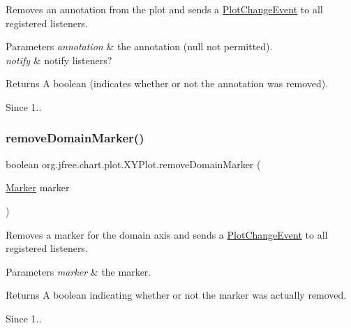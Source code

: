 Removes an annotation from the plot and sends a \mbox{\hyperlink{}{Plot\+Change\+Event}} to all registered listeners.


\begin{DoxyParams}{Parameters}
{\em annotation} & the annotation ({\ttfamily null} not permitted). \\
\hline
{\em notify} & notify listeners?\\
\hline
\end{DoxyParams}
\begin{DoxyReturn}{Returns}
A boolean (indicates whether or not the annotation was removed).
\end{DoxyReturn}
\begin{DoxySince}{Since}
1.. 
\end{DoxySince}
\mbox{\label{classorg_1_1jfree_1_1chart_1_1plot_1_1_x_y_plot_a7ed71c17fd5ae2ff77c3e38e52c0b634}} 
\subsubsection{\texorpdfstring{remove\+Domain\+Marker()}{removeDomainMarker()}\hspace{0.1cm}{\footnotesize\ttfamily [1/4]}}
{\footnotesize\ttfamily boolean org.\+jfree.\+chart.\+plot.\+X\+Y\+Plot.\+remove\+Domain\+Marker (\begin{DoxyParamCaption}\item[{\mbox{\hyperlink{classorg_1_1jfree_1_1chart_1_1plot_1_1_marker}{Marker}}}]{marker }\end{DoxyParamCaption})}

Removes a marker for the domain axis and sends a \mbox{\hyperlink{}{Plot\+Change\+Event}} to all registered listeners.


\begin{DoxyParams}{Parameters}
{\em marker} & the marker.\\
\hline
\end{DoxyParams}
\begin{DoxyReturn}{Returns}
A boolean indicating whether or not the marker was actually removed.
\end{DoxyReturn}
\begin{DoxySince}{Since}
1.. 
\end{DoxySince}
\mbox{\label{classorg_1_1jfree_1_1chart_1_1plot_1_1_x_y_plot_ac5e3c85422eb44952b1fd7c365e23175}} 
